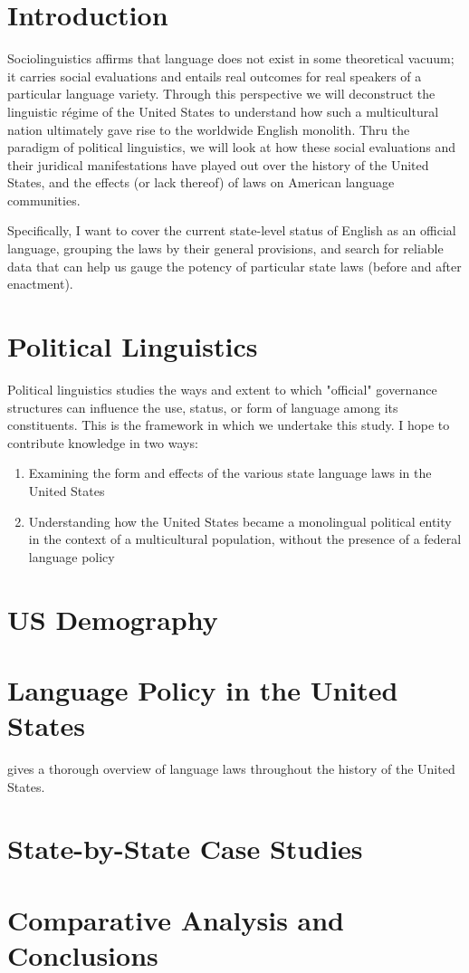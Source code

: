 \documentclass{article}
\begin{document}
\section*{Introduction}

Sociolinguistics affirms that language does not exist in some theoretical
vacuum; it carries social evaluations and entails real outcomes for real
speakers of a particular language variety. Through this perspective we will
deconstruct the linguistic régime of the United States to understand how such a
multicultural nation ultimately gave rise to the worldwide English monolith.
Thru the paradigm of political linguistics, we will look at how these social
evaluations and their juridical manifestations have played out over the history
of the United States, and the effects (or lack thereof) of laws on American
language communities.

Specifically, I want to cover the current state-level status of English as an
official language, grouping the laws by their general provisions, and search for
reliable data that can help us gauge the potency of particular state laws
(before and after enactment).

\section*{Political Linguistics}

Political linguistics studies the ways and extent to which "official" governance
structures can influence the use, status, or form of language among its
constituents. \cite{Calvet96} This is the framework in which we undertake this study. I hope to
contribute knowledge in two ways:

\begin{enumerate}
\item Examining the form and effects of the various state language laws in the
United States
\item Understanding how the United States became a monolingual political entity
in the context of a multicultural population, without the presence of a federal
language policy
\end{enumerate}

\section*{US Demography}

\section*{Language Policy in the United States}

\cite{Baron92} gives a thorough overview of language laws throughout the history
of the United States.

\section*{State-by-State Case Studies}

\section*{Comparative Analysis and Conclusions}

\printbibliography
\end{document}

